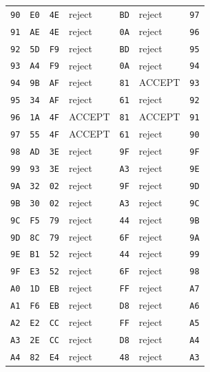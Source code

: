 \begin{longtable}{lllllll}
\texttt{90} & \texttt{E0} & \texttt{4E} & reject & \texttt{BD} & reject & \texttt{97}\\
\texttt{91} & \texttt{AE} & \texttt{4E} & reject & \texttt{0A} & reject & \texttt{96}\\
\texttt{92} & \texttt{5D} & \texttt{F9} & reject & \texttt{BD} & reject & \texttt{95}\\
\texttt{93} & \texttt{A4} & \texttt{F9} & reject & \texttt{0A} & reject & \texttt{94}\\
\texttt{94} & \texttt{9B} & \texttt{AF} & reject & \texttt{81} & ACCEPT & \texttt{93}\\
\texttt{95} & \texttt{34} & \texttt{AF} & reject & \texttt{61} & reject & \texttt{92}\\
\texttt{96} & \texttt{1A} & \texttt{4F} & ACCEPT & \texttt{81} & ACCEPT & \texttt{91}\\
\texttt{97} & \texttt{55} & \texttt{4F} & ACCEPT & \texttt{61} & reject & \texttt{90}\\
\texttt{98} & \texttt{AD} & \texttt{3E} & reject & \texttt{9F} & reject & \texttt{9F}\\
\texttt{99} & \texttt{93} & \texttt{3E} & reject & \texttt{A3} & reject & \texttt{9E}\\
\texttt{9A} & \texttt{32} & \texttt{02} & reject & \texttt{9F} & reject & \texttt{9D}\\
\texttt{9B} & \texttt{30} & \texttt{02} & reject & \texttt{A3} & reject & \texttt{9C}\\
\texttt{9C} & \texttt{F5} & \texttt{79} & reject & \texttt{44} & reject & \texttt{9B}\\
\texttt{9D} & \texttt{8C} & \texttt{79} & reject & \texttt{6F} & reject & \texttt{9A}\\
\texttt{9E} & \texttt{B1} & \texttt{52} & reject & \texttt{44} & reject & \texttt{99}\\
\texttt{9F} & \texttt{E3} & \texttt{52} & reject & \texttt{6F} & reject & \texttt{98}\\
\texttt{A0} & \texttt{1D} & \texttt{EB} & reject & \texttt{FF} & reject & \texttt{A7}\\
\texttt{A1} & \texttt{F6} & \texttt{EB} & reject & \texttt{D8} & reject & \texttt{A6}\\
\texttt{A2} & \texttt{E2} & \texttt{CC} & reject & \texttt{FF} & reject & \texttt{A5}\\
\texttt{A3} & \texttt{2E} & \texttt{CC} & reject & \texttt{D8} & reject & \texttt{A4}\\
\texttt{A4} & \texttt{82} & \texttt{E4} & reject & \texttt{48} & reject & \texttt{A3}\\

\end{longtable}

